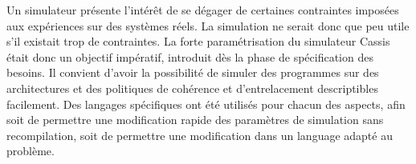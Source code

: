 Un simulateur présente l'intérêt de se dégager de certaines contraintes imposées aux expériences sur des systèmes réels. La simulation ne serait donc que peu utile s'il existait trop de contraintes. La forte paramétrisation du simulateur \textsf{Cassis} était donc un objectif impératif, introduit dès la phase de spécification des besoins. Il convient d'avoir la possibilité de simuler des programmes sur des architectures et des politiques de cohérence et d'entrelacement descriptibles facilement. Des langages spécifiques ont été utilisés pour chacun des aspects, afin soit de permettre une modification rapide des paramètres de simulation sans recompilation, soit de permettre une modification dans un language adapté au problème.




